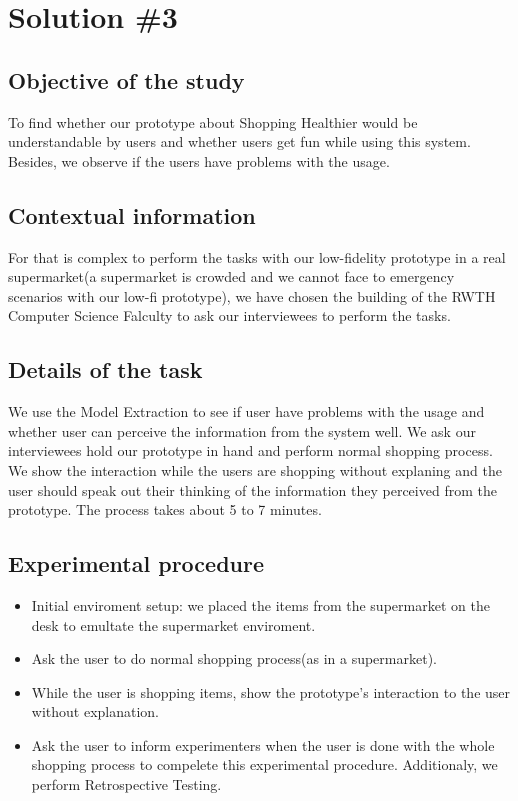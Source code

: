 \section{Solution \#3}

\subsection{Objective of the study}
To find whether our prototype about Shopping Healthier would be understandable by users and whether users get fun while using this system. Besides, we observe if the users have problems with the usage.

\subsection{Contextual information}
For that is complex to perform the tasks with our low-fidelity prototype in a real supermarket(a supermarket is crowded and we cannot face to emergency scenarios with our low-fi prototype), we have chosen the building of the RWTH Computer Science Falculty to ask our interviewees to perform the tasks.

\subsection{Details of the task}
We use the Model Extraction to see if user have problems with the usage and whether user can  perceive the information from the system well. We ask our interviewees hold our prototype in hand and perform normal shopping process. We show the interaction while the users are shopping without explaning and the user should speak out their thinking of the information they perceived from the prototype. The process takes about 5 to 7 minutes.

\subsection{Experimental procedure}
\begin{itemize}
  \item Initial enviroment setup: we placed the items from the supermarket on the desk to emultate the supermarket enviroment.
  \item Ask the user to do normal shopping process(as in a supermarket).
  \item While the user is shopping items, show the prototype's interaction to the user without explanation.
  \item Ask the user to inform experimenters when the user is done with the whole shopping process to compelete this experimental procedure.
Additionaly, we perform Retrospective Testing.
\end{itemize}


